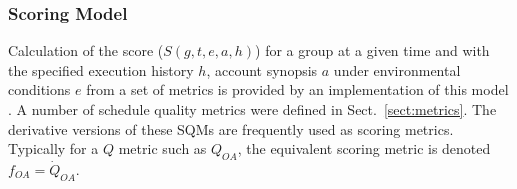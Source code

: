 \subsubsection{Scoring Model}
\label{ss:scoringmodel}
\label{ss:scoring_model}
Calculation of the score ($S(g,t,e,a,h)$) for a group at a given time and with the specified execution history $h$, account synopsis $a$ under environmental conditions $e$ from a set of metrics is provided by an implementation of this model . A number of schedule quality metrics were defined in Sect.~\ref{sect:metrics}. The derivative versions of these SQMs are frequently used as scoring metrics. Typically for a $Q$ metric such as $Q_{OA}$, the equivalent scoring metric is denoted $f_{OA} = \dot{Q}_{OA}$.
